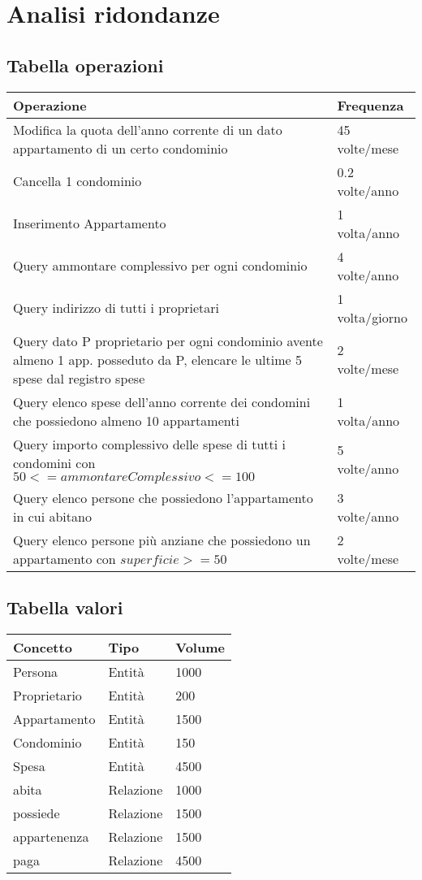 \section{Analisi ridondanze}
\label{ridondanze}

\subsection{Tabella operazioni}

\begin{tabular}{|p{320pt}|l|}
	\hline
	\textbf{Operazione} & \textbf{Frequenza} \\ \hline
	Modifica la quota dell'anno corrente di un dato appartamento di un certo condominio & 45 volte/mese \\ \hline
	Cancella 1 condominio & 0.2 volte/anno \\ \hline
	Inserimento Appartamento & 1 volta/anno \\ \hline
	Query ammontare complessivo per ogni condominio & 4 volte/anno \\ \hline
	Query indirizzo di tutti i proprietari & 1 volta/giorno \\ \hline
	Query dato P proprietario per ogni condominio avente almeno 1 app. posseduto da P, elencare le ultime 5 spese dal registro spese & 2 volte/mese \\ \hline
	Query elenco spese dell'anno corrente dei condomini che possiedono almeno 10 appartamenti & 1 volta/anno \\ \hline
	Query importo complessivo delle spese di tutti i condomini con $50 <= ammontareComplessivo <= 100$ & 5 volte/anno \\ \hline
	Query elenco persone che possiedono l'appartamento in cui abitano & 3 volte/anno \\ \hline
	Query elenco persone più anziane che possiedono un appartamento con $superficie >= 50$ & 2 volte/mese \\ \hline
\end{tabular}

\subsection{Tabella valori}
\label{tabellaValori}

\begin{tabular}{|l|l|l|}
	\hline
	Concetto & Tipo & Volume \\ \hline
	Persona & Entità & 1000 \\ \hline
	Proprietario & Entità & 200 \\ \hline
	Appartamento & Entità & 1500 \\ \hline
	Condominio & Entità & 150 \\ \hline
	Spesa & Entità & 4500 \\ \hline
	abita & Relazione & 1000 \\ \hline
	possiede & Relazione & 1500 \\ \hline
	appartenenza & Relazione & 1500 \\ \hline
	paga & Relazione & 4500 \\ \hline
\end{tabular}


